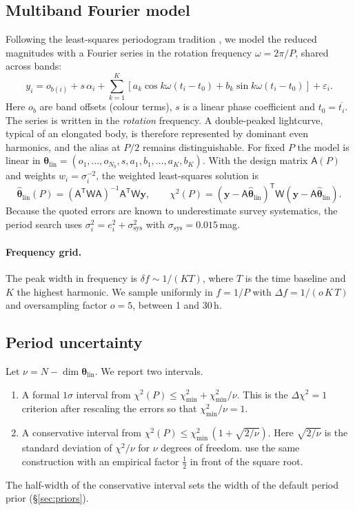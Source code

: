 \documentclass[11pt,a4paper]{article}
\theoremstyle{remark}
\newcommand{\vect}[1]{\bm{#1}}
\newcommand{\T}{^{\mathsf T}}
\begin{document}
\subsection{Multiband Fourier model}
Following the least-squares periodogram tradition \citep{lomb1976,scargle1982,vanderplas2018}, we
model the reduced magnitudes with a Fourier series in the rotation frequency $\omega=2\pi/P$, shared
across bands:
\begin{equation}
  y_i = o_{b(i)} + s\,\alpha_i + \sum_{k=1}^{K}\left[a_k\cos k\omega(t_i-t_0) + b_k\sin k\omega(t_i-t_0)\right]
        + \varepsilon_i .
  \label{eq:fourier}
\end{equation}
Here $o_b$ are band offsets (colour terms), $s$ is a linear phase coefficient and
$t_0=\overline{t_i}$. The series is written in the \emph{rotation} frequency. A double-peaked
lightcurve, typical of an elongated body, is therefore represented by dominant even harmonics, and the
alias at $P/2$ remains distinguishable. For fixed $P$ the model is linear in
$\vect{\theta}_{\mathrm{lin}}=(o_1,\dots,o_{N_b},s,a_1,b_1,\dots,a_K,b_K)$. With the design matrix
$\mathsf{A}(P)$ and weights $w_i=\sigma_i^{-2}$, the weighted least-squares solution is
\begin{equation}
  \hat{\vect\theta}_{\mathrm{lin}}(P) = (\mathsf{A}\T\mathsf{W}\mathsf{A})^{-1}\mathsf{A}\T\mathsf{W}\vect y,\qquad
  \chi^2(P) = (\vect y-\mathsf{A}\hat{\vect\theta}_{\mathrm{lin}})\T\mathsf W(\vect y-\mathsf{A}\hat{\vect\theta}_{\mathrm{lin}}).
\end{equation}
Because the quoted errors are known to underestimate survey systematics, the period search uses
$\sigma_i^2=e_i^2+\sigma_{\mathrm{sys}}^2$ with $\sigma_{\mathrm{sys}}=0.015$\,mag.

\paragraph{Frequency grid.} The peak width in frequency is $\delta f\sim1/(KT)$, where $T$ is the time
baseline and $K$ the highest harmonic. We sample uniformly in $f=1/P$ with
$\Delta f = 1/(o\,K\,T)$ and oversampling factor $o=5$, between 1 and 30\,h.

\subsection{Period uncertainty}
Let $\nu=N-\dim\vect\theta_{\mathrm{lin}}$. We report two intervals.
\begin{enumerate}[nosep]
\item A formal $1\sigma$ interval from $\chi^2(P)\le\chi^2_{\min}+\chi^2_{\min}/\nu$. This is the
  $\Delta\chi^2=1$ criterion after rescaling the errors so that $\chi^2_{\min}/\nu=1$.
\item A conservative interval from $\chi^2(P)\le\chi^2_{\min}\,(1+\sqrt{2/\nu})$. Here $\sqrt{2/\nu}$ is
  the standard deviation of $\chi^2/\nu$ for $\nu$ degrees of freedom.
  \citet{durech2018} use the same construction with an empirical factor $\tfrac12$ in front of the
  square root.
\end{enumerate}
The half-width of the conservative interval sets the width of the default period prior
(\S\ref{sec:priors}).
\end{document}
